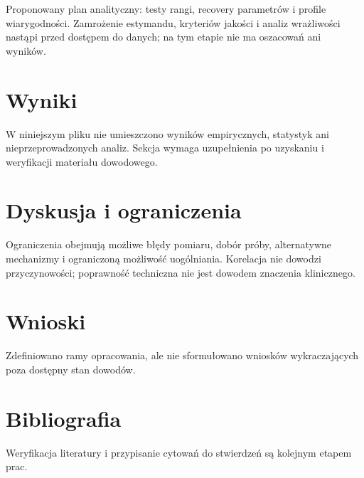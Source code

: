 \documentclass[11pt,a4paper]{article}
\begin{document}
Proponowany plan analityczny: testy rangi, recovery parametrów i profile wiarygodności. Zamrożenie estymandu, kryteriów jakości i analiz wrażliwości nastąpi przed dostępem do danych; na tym etapie nie ma oszacowań ani wyników.

\section{Wyniki}

W niniejszym pliku nie umieszczono wyników empirycznych, statystyk ani nieprzeprowadzonych analiz. Sekcja wymaga uzupełnienia po uzyskaniu i weryfikacji materiału dowodowego.

\section{Dyskusja i ograniczenia}

Ograniczenia obejmują możliwe błędy pomiaru, dobór próby, alternatywne mechanizmy i ograniczoną możliwość uogólniania. Korelacja nie dowodzi przyczynowości; poprawność techniczna nie jest dowodem znaczenia klinicznego.

\section{Wnioski}

Zdefiniowano ramy opracowania, ale nie sformułowano wniosków wykraczających poza dostępny stan dowodów.

\section*{Bibliografia}

Weryfikacja literatury i przypisanie cytowań do stwierdzeń są kolejnym etapem prac.
\end{document}
